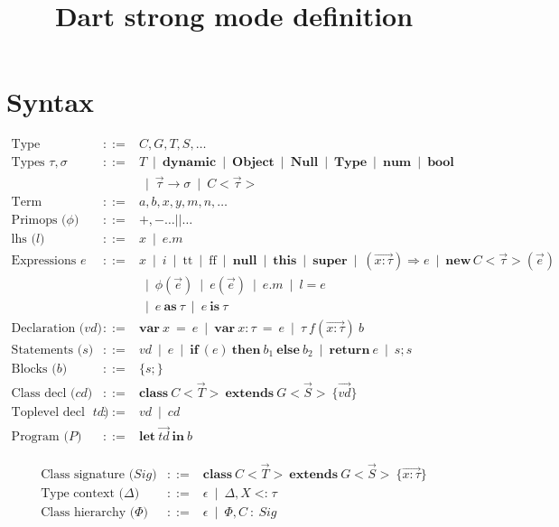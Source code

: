 \documentclass[fleqn]{article}
\title{Dart strong mode definition}
\newcommand{\Arrow}[2]{#1 \rightarrow #2}
\newcommand{\Bool}{\mathbf{bool}}
\newcommand{\Dynamic}{\mathbf{dynamic}}
\newcommand{\Null}{\mathbf{Null}}
\newcommand{\Num}{\mathbf{num}}
\newcommand{\Object}{\mathbf{Object}}
\newcommand{\TApp}[2]{#1\mathrm{<}#2\mathrm{>}}
\newcommand{\Type}{\mathbf{Type}}
\newcommand{\eapp}[2]{#1(#2)}
\newcommand{\eas}[2]{#1\ \mathbf{as}\ #2}
\newcommand{\eassign}[2]{#1 = #2}
\newcommand{\eff}{\mathrm{ff}}
\newcommand{\eis}[2]{#1\ \mathbf{is}\ #2}
\newcommand{\elambda}[2]{(#1) \Rightarrow #2}
\newcommand{\enew}[3]{\mathbf{new}\,\TApp{#1}{#2}(#3)}
\newcommand{\enull}{\mathbf{null}}
\newcommand{\eprimapp}[2]{\eapp{#1}{#2}}
\newcommand{\eproj}[2]{#1.#2}
\newcommand{\esuper}{\mathbf{super}}
\newcommand{\ethis}{\mathbf{this}}
\newcommand{\ett}{\mathrm{tt}}
\newcommand{\kwclass}{\mathbf{class}}
\newcommand{\kwextends}{\mathbf{extends}}
\newcommand{\kwelse}{\mathbf{else}}
\newcommand{\kwif}{\mathbf{if}}
\newcommand{\kwin}{\mathbf{in}}
\newcommand{\kwlet}{\mathbf{let}}
\newcommand{\kwreturn}{\mathbf{return}}
\newcommand{\kwthen}{\mathbf{then}}
\newcommand{\kwvar}{\mathbf{var}}
\newcommand{\dclass}[3]{\kwclass\ #1\ \kwextends\ #2\ \{#3\}}
\newcommand{\dfun}[4]{#1\ #2(#3)\ #4}
\newcommand{\dvar}[2]{\kwvar\ #1\ =\ #2}
\newcommand{\sifthenelse}[3]{\kwif\ (#1)\ \kwthen\ #2\ \kwelse\ #3}
\newcommand{\sreturn}[1]{\kwreturn\ #1}
\newcommand{\program}[2]{\kwlet\ #1\ \kwin\ #2}
\newcommand{\sub}{\mathop{<:}}
\newcommand{\many}[1]{\overrightarrow{#1}}
\newcommand{\alt}{\ \mathop{|}\ }
\begin{document}
\section*{Syntax}


\[
\begin{array}{lcl}
\text{Type identifiers} & ::= &  C, G, T, S, \ldots \\
%
\text{Types $\tau, \sigma$} & ::= &
 T \alt \Dynamic \alt \Object \alt \Null \alt \Type \alt \Num \alt \Bool \\ &&
   \alt \Arrow{\many{\tau}}{\sigma} \alt \TApp{C}{\many{\tau}} \\
%
\text{Term identifiers} & ::= & a, b, x, y, m, n, \ldots \\
%
\text{Primops ($\phi$)} & ::= & \mathrm{+}, \mathrm{-} \ldots \mathrm{||} \ldots \\
%
\text{lhs ($l$)} & ::= & x \alt \eproj{e}{m} \\
%
\text{Expressions $e$} & ::= & 
 x \alt i \alt \ett \alt \eff \alt \enull \alt \ethis \alt \esuper
   \alt \elambda{\many{x:\tau}}{e} \alt \enew{C}{\many{\tau}}{\many{e}} \\&&
   \alt \eprimapp{\phi}{\many{e}} \alt \eapp{e}{\many{e}} 
   \alt \eproj{e}{m} \alt \eassign{l}{e} \\&&
   \alt \eas{e}{\tau} \alt \eis{e}{\tau} \\
%
\text{Declaration ($\mathit{vd}$)} & ::= &
   \dvar{x}{e} \alt \dvar{x:\tau}{e} \alt \dfun{\tau}{f}{\many{x:\tau}}{b} \\
%
\text{Statements ($s$)} & ::= & \mathit{vd} \alt e \alt \sifthenelse{e}{b_1}{b_2} 
   \alt \sreturn{e} \alt s;s \\
%
\text{Blocks ($b$)} & ::= & \{s;\} \\
%
\text{Class decl ($\mathit{cd}$)} & ::= & \dclass{\TApp{C}{\many{T}}}{\TApp{G}{\many{S}}}{\many{\mathit{vd}}} \\
%
\text{Toplevel decl ($\mathit{td}$)} & ::= & \mathit{vd} \alt \mathit{cd}\\
%
\text{Program ($P$)} & ::= & \program{\many{\mathit{td}}}{b}
\end{array}
\]



\[
\begin{array}{lcl}
\text{Class signature ($\mathit{Sig}$)} & ::= &  \dclass{\TApp{C}{\many{T}}}{\TApp{G}{\many{S}}}{\many{x:\tau}} \\
\text{Type context ($\Delta$)} & ::= &  \epsilon \alt \Delta, X \sub \tau \\
\text{Class hierarchy ($\Phi$)} & ::= &  \epsilon \alt \Phi, C\ :\ \mathit{Sig}
\end{array}
\]
\end{document}
